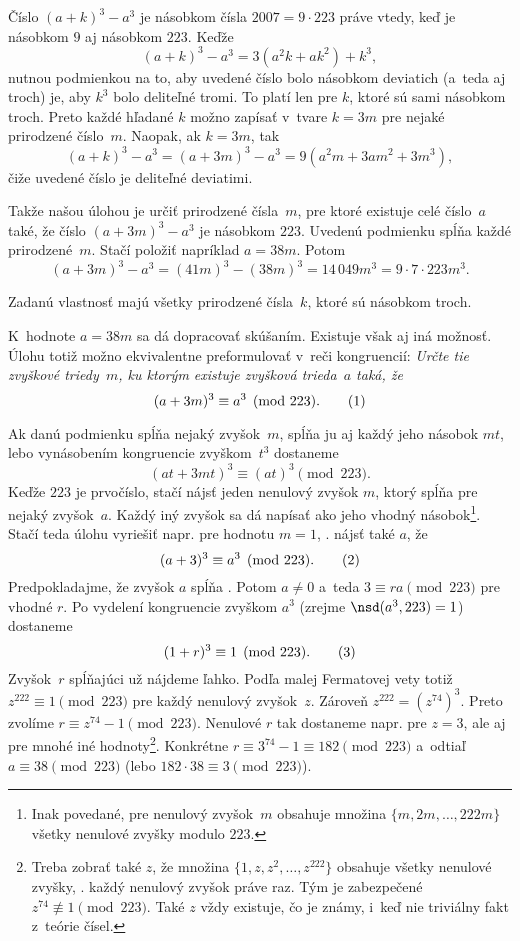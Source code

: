 {%
Číslo $(a+k)^3-a^3$ je násobkom čísla $2007=9\cdot223$ práve vtedy, keď je násobkom $9$ aj násobkom $223$. Keďže 
$$
(a+k)^3-a^3=3(a^2k+ak^2)+k^3,
$$
nutnou podmienkou na to, aby uvedené číslo bolo násobkom deviatich (a~teda aj troch) je, aby $k^3$ bolo deliteľné tromi. To platí len pre $k$, ktoré sú sami násobkom troch. Preto každé hľadané $k$ možno zapísať v~tvare $k=3m$ pre nejaké prirodzené číslo~$m$. Naopak, ak $k=3m$, tak
$$
(a+k)^3-a^3=(a+3m)^3-a^3=9(a^2m+3am^2+3m^3),
$$
čiže uvedené číslo je deliteľné deviatimi.

Takže našou úlohou je určiť prirodzené čísla~$m$, pre ktoré existuje celé číslo~$a$ také, že číslo $(a+3m)^3-a^3$
je násobkom $223$. Uvedenú podmienku spĺňa každé prirodzené~$m$. Stačí položiť napríklad $a=38m$. Potom
$$
(a+3m)^3-a^3=(41m)^3-(38m)^3=14\,049m^3=9\cdot7\cdot223m^3.
$$

\odpoved
Zadanú vlastnosť majú všetky prirodzené čísla~$k$, ktoré sú násobkom troch.

\poznamka
K~hodnote $a=38m$ sa dá dopracovať skúšaním. Existuje však aj iná možnosť. Úlohu totiž možno ekvivalentne preformulovať v~reči kongruencií: {\sl Určte tie zvyškové triedy~$m$, ku ktorým existuje zvyšková trieda~$a$ taká, že
$$
(a+3m)^3\equiv a^3\pmod{223}.
\tag1
$$}%

Ak danú podmienku spĺňa nejaký zvyšok~$m$, spĺňa ju aj každý jeho násobok $mt$, lebo vynásobením kongruencie  zvyškom~$t^3$ dostaneme
$$
(at+3mt)^3\equiv (at)^3\pmod{223}.
$$
Keďže $223$ je prvočíslo, stačí nájsť jeden nenulový zvyšok $m$, ktorý spĺňa  pre nejaký zvyšok~$a$. Každý iný zvyšok sa dá napísať ako jeho vhodný násobok\footnote{Inak povedané, pre nenulový zvyšok~$m$ obsahuje množina $\{m,2m,\dots,222m\}$ všetky nenulové zvyšky modulo $223$.}. Stačí teda úlohu vyriešiť napr. pre hodnotu $m=1$, \tj. nájsť také $a$, že
$$
(a+3)^3\equiv a^3\pmod{223}.
\tag2
$$
Predpokladajme, že zvyšok $a$ spĺňa . Potom $a\ne0$ a~teda $3\equiv ra\pmod{223}$ pre vhodné $r$. Po vydelení kongruencie  zvyškom $a^3$ (zrejme $\nsd(a^3,223)=1$) dostaneme
$$
(1+r)^3\equiv 1\pmod{223}.
\tag3
$$
Zvyšok~$r$ spĺňajúci  už nájdeme ľahko. Podľa malej Fermatovej vety totiž $z^{222}\equiv1\pmod{223}$ pre každý nenulový zvyšok~$z$. Zároveň $z^{222}=(z^{74})^3$. Preto zvolíme $r\equiv z^{74}-1\pmod{223}$. Nenulové $r$ tak dostaneme napr. pre $z=3$, ale aj pre mnohé iné hodnoty\footnote{Treba zobrať také $z$, že množina $\{1,z,z^2,\dots,z^{222}\}$ obsahuje všetky nenulové zvyšky, \tj. každý nenulový zvyšok práve raz. Tým je zabezpečené $z^{74}\nequiv1\pmod{223}$. Také $z$ vždy existuje, čo je známy, i~keď nie triviálny fakt z~teórie čísel.}. Konkrétne $r\equiv3^{74}-1\equiv182\pmod{223}$ a~odtiaľ $a\equiv38\pmod{223}$ (lebo $182\cdot38\equiv3\pmod{223}$).

}
